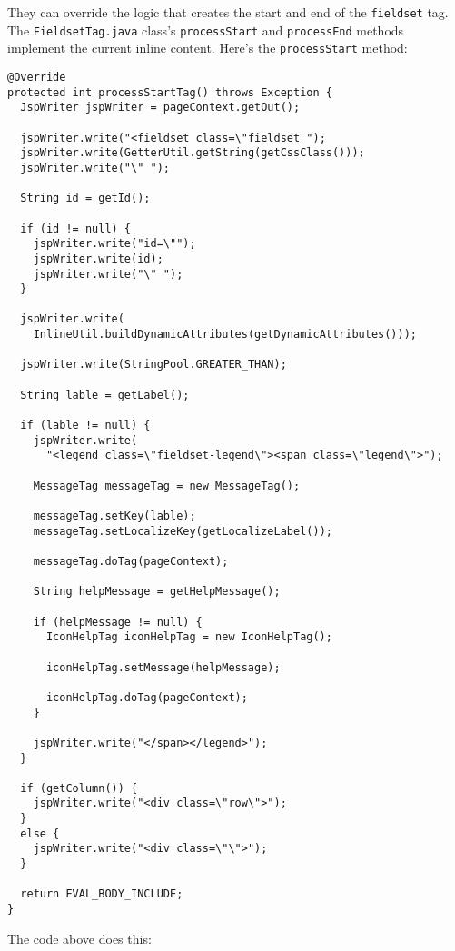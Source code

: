 They can override the logic that creates the start and end of the
\texttt{fieldset} tag. The \texttt{FieldsetTag.java} class's
\texttt{processStart} and \texttt{processEnd} methods implement the
current inline content. Here's the
\href{https://github.com/liferay/liferay-portal/blob/7.2.x/util-taglib/src/com/liferay/taglib/aui/FieldsetTag.java\#L86-L141}{\texttt{processStart}}
method:

\begin{verbatim}
@Override
protected int processStartTag() throws Exception {
  JspWriter jspWriter = pageContext.getOut();

  jspWriter.write("<fieldset class=\"fieldset ");
  jspWriter.write(GetterUtil.getString(getCssClass()));
  jspWriter.write("\" ");

  String id = getId();

  if (id != null) {
    jspWriter.write("id=\"");
    jspWriter.write(id);
    jspWriter.write("\" ");
  }

  jspWriter.write(
    InlineUtil.buildDynamicAttributes(getDynamicAttributes()));

  jspWriter.write(StringPool.GREATER_THAN);

  String lable = getLabel();

  if (lable != null) {
    jspWriter.write(
      "<legend class=\"fieldset-legend\"><span class=\"legend\">");

    MessageTag messageTag = new MessageTag();

    messageTag.setKey(lable);
    messageTag.setLocalizeKey(getLocalizeLabel());

    messageTag.doTag(pageContext);

    String helpMessage = getHelpMessage();

    if (helpMessage != null) {
      IconHelpTag iconHelpTag = new IconHelpTag();

      iconHelpTag.setMessage(helpMessage);

      iconHelpTag.doTag(pageContext);
    }

    jspWriter.write("</span></legend>");
  }

  if (getColumn()) {
    jspWriter.write("<div class=\"row\">");
  }
  else {
    jspWriter.write("<div class=\"\">");
  }

  return EVAL_BODY_INCLUDE;
}
\end{verbatim}

The code above does this:

